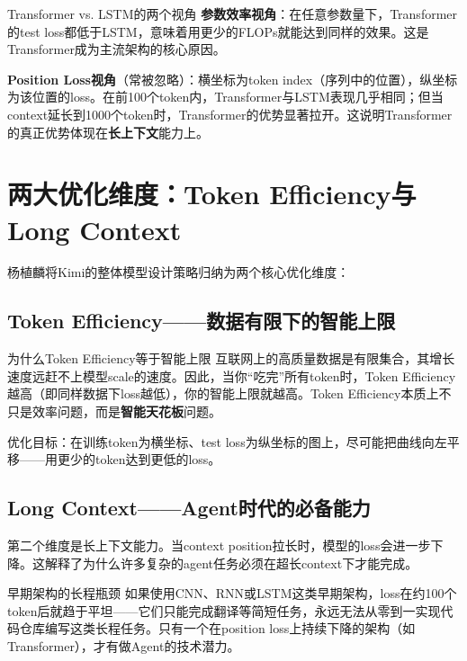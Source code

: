 \documentclass[a4paper]{article}
\begin{document}
\begin{knowledgebox}{Transformer vs. LSTM的两个视角}
\textbf{参数效率视角}：在任意参数量下，Transformer的test loss都低于LSTM，意味着用更少的FLOPs就能达到同样的效果。这是Transformer成为主流架构的核心原因。

\textbf{Position Loss视角}（常被忽略）：横坐标为token index（序列中的位置），纵坐标为该位置的loss。在前100个token内，Transformer与LSTM表现几乎相同；但当context延长到1000个token时，Transformer的优势显著拉开。这说明Transformer的真正优势体现在\textbf{长上下文}能力上。
\end{knowledgebox}


\section{两大优化维度：Token Efficiency与Long Context}

杨植麟将Kimi的整体模型设计策略归纳为两个核心优化维度：

\subsection{Token Efficiency——数据有限下的智能上限}

\begin{importantbox}{为什么Token Efficiency等于智能上限}
互联网上的高质量数据是有限集合，其增长速度远赶不上模型scale的速度。因此，当你``吃完''所有token时，Token Efficiency越高（即同样数据下loss越低），你的智能上限就越高。Token Efficiency本质上不只是效率问题，而是\textbf{智能天花板}问题。
\end{importantbox}

优化目标：在训练token为横坐标、test loss为纵坐标的图上，尽可能把曲线向左平移——用更少的token达到更低的loss。

\subsection{Long Context——Agent时代的必备能力}

第二个维度是长上下文能力。当context position拉长时，模型的loss会进一步下降。这解释了为什么许多复杂的agent任务必须在超长context下才能完成。

\begin{warningbox}{早期架构的长程瓶颈}
如果使用CNN、RNN或LSTM这类早期架构，loss在约100个token后就趋于平坦——它们只能完成翻译等简短任务，永远无法从零到一实现代码仓库编写这类长程任务。只有一个在position loss上持续下降的架构（如Transformer），才有做Agent的技术潜力。
\end{warningbox}
\end{document}
